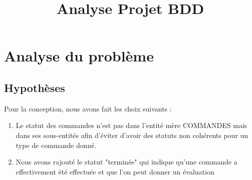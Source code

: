 \documentclass[10pt, a4paper]{article}
\title{Analyse Projet BDD}
\date{}
\begin{document}
\maketitle
\tableofcontents
\newpage

\section{Analyse du problème}
\subsection{Hypothèses}
Pour la conception, nous avons fait les choix suivants :
\begin{enumerate}
    \item Le statut des commandes n'est pas dans l'entité mère COMMANDES 
mais dans ses sous-entités afin d'éviter d'avoir des statuts non cohérents 
pour un type de commande donné.
    \item Nous avons rajouté le statut "terminée" qui indique qu'une 
commande a effectivement été effectuée et que l'on peut donner un 
évaluation
\end{enumerate}
\end{document}
